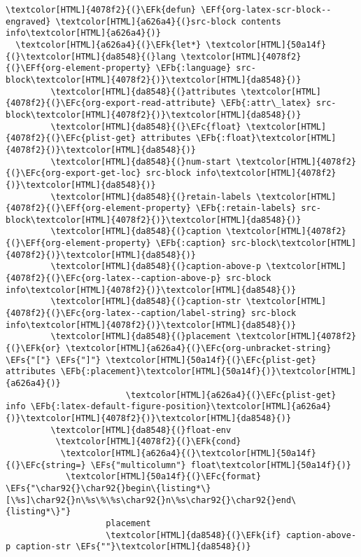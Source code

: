 \documentclass{scrartcl}
\newcommand{\EFk}[1]{\textcolor{EFk}{#1}} %
\newcommand{\EFs}[1]{\textcolor{EFs}{#1}} %
\newcommand{\EFb}[1]{\textcolor{EFb}{#1}} %
\newcommand{\EFc}[1]{\textcolor{EFc}{#1}} %
\newcommand{\EFf}[1]{\textcolor{EFf}{#1}} %
\begin{document}
\begin{enumerate}
\begin{Code}
\begin{Verbatim}[]
\textcolor[HTML]{4078f2}{(}\EFk{defun} \EFf{org-latex-scr-block--engraved} \textcolor[HTML]{a626a4}{(}src-block contents info\textcolor[HTML]{a626a4}{)}
  \textcolor[HTML]{a626a4}{(}\EFk{let*} \textcolor[HTML]{50a14f}{(}\textcolor[HTML]{da8548}{(}lang \textcolor[HTML]{4078f2}{(}\EFf{org-element-property} \EFb{:language} src-block\textcolor[HTML]{4078f2}{)}\textcolor[HTML]{da8548}{)}
         \textcolor[HTML]{da8548}{(}attributes \textcolor[HTML]{4078f2}{(}\EFc{org-export-read-attribute} \EFb{:attr\_latex} src-block\textcolor[HTML]{4078f2}{)}\textcolor[HTML]{da8548}{)}
         \textcolor[HTML]{da8548}{(}\EFc{float} \textcolor[HTML]{4078f2}{(}\EFc{plist-get} attributes \EFb{:float}\textcolor[HTML]{4078f2}{)}\textcolor[HTML]{da8548}{)}
         \textcolor[HTML]{da8548}{(}num-start \textcolor[HTML]{4078f2}{(}\EFc{org-export-get-loc} src-block info\textcolor[HTML]{4078f2}{)}\textcolor[HTML]{da8548}{)}
         \textcolor[HTML]{da8548}{(}retain-labels \textcolor[HTML]{4078f2}{(}\EFf{org-element-property} \EFb{:retain-labels} src-block\textcolor[HTML]{4078f2}{)}\textcolor[HTML]{da8548}{)}
         \textcolor[HTML]{da8548}{(}caption \textcolor[HTML]{4078f2}{(}\EFf{org-element-property} \EFb{:caption} src-block\textcolor[HTML]{4078f2}{)}\textcolor[HTML]{da8548}{)}
         \textcolor[HTML]{da8548}{(}caption-above-p \textcolor[HTML]{4078f2}{(}\EFc{org-latex--caption-above-p} src-block info\textcolor[HTML]{4078f2}{)}\textcolor[HTML]{da8548}{)}
         \textcolor[HTML]{da8548}{(}caption-str \textcolor[HTML]{4078f2}{(}\EFc{org-latex--caption/label-string} src-block info\textcolor[HTML]{4078f2}{)}\textcolor[HTML]{da8548}{)}
         \textcolor[HTML]{da8548}{(}placement \textcolor[HTML]{4078f2}{(}\EFk{or} \textcolor[HTML]{a626a4}{(}\EFc{org-unbracket-string} \EFs{"["} \EFs{"]"} \textcolor[HTML]{50a14f}{(}\EFc{plist-get} attributes \EFb{:placement}\textcolor[HTML]{50a14f}{)}\textcolor[HTML]{a626a4}{)}
                        \textcolor[HTML]{a626a4}{(}\EFc{plist-get} info \EFb{:latex-default-figure-position}\textcolor[HTML]{a626a4}{)}\textcolor[HTML]{4078f2}{)}\textcolor[HTML]{da8548}{)}
         \textcolor[HTML]{da8548}{(}float-env
          \textcolor[HTML]{4078f2}{(}\EFk{cond}
           \textcolor[HTML]{a626a4}{(}\textcolor[HTML]{50a14f}{(}\EFc{string=} \EFs{"multicolumn"} float\textcolor[HTML]{50a14f}{)}
            \textcolor[HTML]{50a14f}{(}\EFc{format} \EFs{"\char92{}\char92{}begin\{listing*\}[\%s]\char92{}n\%s\%\%s\char92{}n\%s\char92{}\char92{}end\{listing*\}"}
                    placement
                    \textcolor[HTML]{da8548}{(}\EFk{if} caption-above-p caption-str \EFs{""}\textcolor[HTML]{da8548}{)}

\end{Verbatim}
\end{Code}
\end{enumerate}
\end{document}
